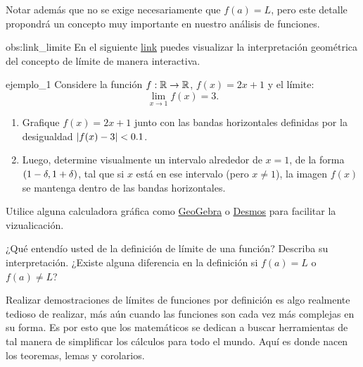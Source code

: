\begin{center}
\end{center}

Notar además que no se exige necesariamente que $f(a) = L$, pero este detalle propondrá un concepto muy importante en nuestro análisis de funciones.

\begin{remark}{}{obs:link_limite}
  En el siguiente \href{https://ggbm.at/p8fsxasx}{link} puedes visualizar la interpretación geométrica del concepto de límite de manera interactiva.
\end{remark}

\begin{exercise}{}{ejemplo_1}
  Considere la función $f:\mathbb{R} \to \mathbb{R}$, $f(x) = 2x+1$ y el límite:
  \[\lim_{x \to 1}{f(x)} = 3. \]
  \begin{enumerate}
    \item Grafique $f(x)=2x+1$ junto con las bandas horizontales definidas por la desigualdad $\left| f(x)-3 \right|<0.1$.
    \item Luego, determine visualmente un intervalo alrededor de $x=1$, de la forma $\left( 1-\delta , 1+\delta \right)$, tal que si $x$ está en ese intervalo (pero $x \neq 1$), la imagen $f(x)$ se mantenga dentro de las bandas horizontales.
  \end{enumerate}
  Utilice alguna calculadora gráfica como \href{https://www.geogebra.org/calculator}{GeoGebra} o \href{https://www.desmos.com/calculator?lang=es}{Desmos} para facilitar la vizualicación.
\end{exercise}

\begin{question}{}{}
  ¿Qué entendío usted de la definición de límite de una función? Describa su interpretación. ¿Existe alguna diferencia en la definición si $f(a) = L$ o $f(a) \neq L$?
\end{question}

Realizar demostraciones de límites de funciones por definición es algo realmente tedioso de realizar, más aún cuando las funciones son cada vez más complejas en su forma. Es por esto que los matemáticos se dedican a buscar herramientas de tal manera de simplificar los cálculos para todo el mundo. Aquí es donde nacen los teoremas, lemas y corolarios.

